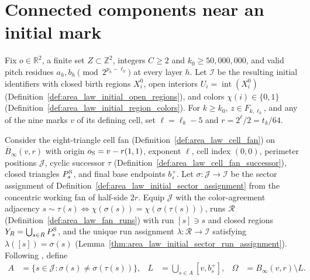 
\section{Connected components near an initial mark}
\label{sec:area_law_initial_sector_components}

Fix $o\in\mathbb R^2$, a finite set $Z\subset\mathbb Z^2$, integers $C\ge2$ and $k_0\ge50{,}000{,}000$, and valid pitch residues $a_h,b_h\pmod{2^{p_h-\ell_h}}$ at every layer $h$.
Let $\mathcal I$ be the resulting initial identifiers with closed birth regions $X_i^0$, open interiors $U_i=\operatorname{int}(X_i^0)$ (Definition~\ref{def:area_law_initial_open_regions}), and colors $\chi(i)\in\{0,1\}$ (Definition~\ref{def:area_law_initial_region_colors}).
For $k\ge k_0$, $z\in F_{k,\ell_k}$, and any of the nine marks $v$ of its defining cell, set $\ell=\ell_k-5$ and $r=2^\ell/2=t_k/64$.

Consider the eight-triangle cell fan (Definition~\ref{def:area_law_cell_fan}) on $\overline B_\infty(v,r)$ with origin $o_{\rm S}=v-r(1,1)$, exponent $\ell$, cell index $(0,0)$, perimeter positions $\mathcal J$, cyclic successor $\tau$ (Definition~\ref{def:area_law_cell_fan_successor}), closed triangles $P_s^{\rm S}$, and final base endpoints $b_s^+$.
Let $\sigma:\mathcal J\to\mathcal I$ be the sector assignment of Definition~\ref{def:area_law_initial_sector_assignment} from the concentric working fan of half-side $2r$.
Equip $\mathcal J$ with the color-agreement adjacency $s\sim\tau(s)\iff\chi(\sigma(s))=\chi(\sigma(\tau(s)))$, runs $\mathcal R$ (Definition~\ref{def:area_law_fan_runs}) with run $[s]\ni s$ and closed regions $Y_R=\bigcup_{s\in R}P_s^{\rm S}$, and the unique run assignment $\lambda:\mathcal R\to\mathcal I$ satisfying $\lambda([s])=\sigma(s)$ (Lemma~\ref{thm:area_law_initial_sector_run_assignment}).
Following \cite[Section~11]{OpenAI2026AreaLaw}, define
\begin{align}
    A      & =\{s\in\mathcal J:\sigma(s)\ne\sigma(\tau(s))\}, &
    L      & =\bigcup_{s\in A}[v,b_s^+],                      &
    \Omega & =B_\infty(v,r)\setminus L.
    \label{eq:area_law_initial_cut_square}
\end{align}

